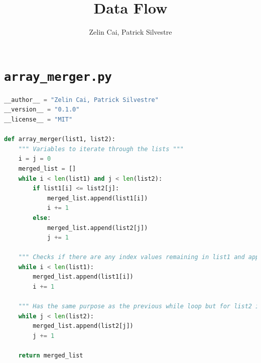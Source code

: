 \documentclass[11pt, oneside]{article}   	%
\title{Data Flow}
\author{Zelin Cai, Patrick Silvestre}
\begin{document}
\maketitle

\section{\texttt{array\_merger.py}}
\begin{lstlisting}[language=Python]
__author__ = "Zelin Cai, Patrick Silvestre"
__version__ = "0.1.0"
__license__ = "MIT"

def array_merger(list1, list2):
	""" Variables to iterate through the lists """
	i = j = 0
	merged_list = []
	while i < len(list1) and j < len(list2):
		if list1[i] <= list2[j]:
			merged_list.append(list1[i])
			i += 1
		else:
			merged_list.append(list2[j])
			j += 1

	""" Checks if there are any index values remaining in list1 and appends them """
	while i < len(list1):
		merged_list.append(list1[i])
		i += 1

	""" Has the same purpose as the previous while loop but for list2 instead """
	while j < len(list2):
		merged_list.append(list2[j])
		j += 1

	return merged_list
\end{lstlisting}

\newpage
\end{document}
